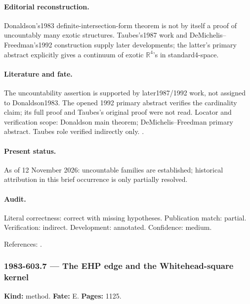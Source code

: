 \paragraph{Editorial reconstruction.} Donaldson's1983 definite-intersection-form theorem is not by itself a proof of uncountably many exotic structures. Taubes's1987 work and DeMichelis--Freedman's1992 construction supply later developments; the latter's primary abstract explicitly gives a continuum of exotic \(\mathbb R^4\)'s in standard4-space.

\paragraph{Literature and fate.} The uncountability assertion is supported by later1987/1992 work, not assigned to Donaldson1983. The opened 1992 primary abstract verifies the cardinality claim; its full proof and Taubes's original proof were not read. Locator and verification scope: Donaldson main theorem; DeMichelis--Freedman primary abstract. Taubes role verified indirectly only. \cite{donaldson1983selfdual,taubes1987periodic,demichelisfreedman1992uncountably}.

\paragraph{Present status.} As of 12 November 2026: uncountable families are established; historical attribution in this brief occurrence is only partially resolved.

\paragraph{Audit.} Literal correctness: correct with missing hypotheses. Publication match: partial. Verification: indirect. Development: annotated. Confidence: medium.

\noindent References: \citep{donaldson1983selfdual,taubes1987periodic,demichelisfreedman1992uncountably}.\par

\subsubsection{1983-603.7 --- The EHP edge and the Whitehead-square kernel}

\label{item:1983-603.7}

\noindent\textbf{Kind:} method. \textbf{Fate:} E. \textbf{Pages:} 1125.\par

